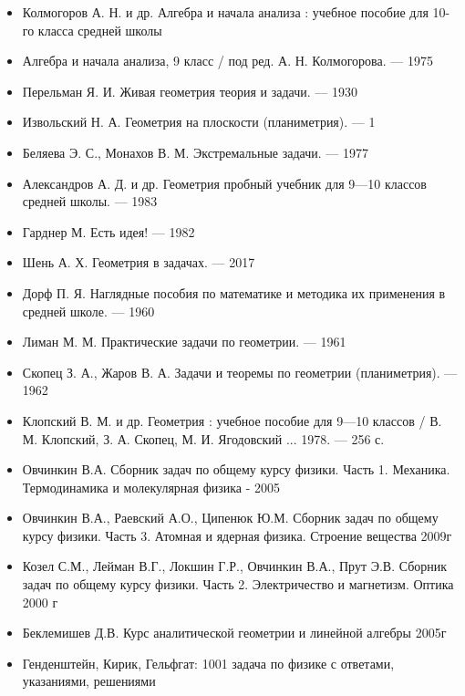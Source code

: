 \begin{itemize}
    \item Колмогоров А. Н. и др. Алгебра и начала анализа : учебное пособие для 10-го класса средней школы
    \item Алгебра и начала анализа, 9 класс / под ред. А. Н. Колмогорова. — 1975
    \item Перельман Я. И. Живая геометрия теория и задачи. — 1930
    \item Извольский Н. А. Геометрия на плоскости (планиметрия). — 1
    \item Беляева Э. С., Монахов В. М. Экстремальные задачи. — 1977
    \item Александров А. Д. и др. Геометрия пробный учебник для 9—10 классов средней школы. — 1983
    \item Гарднер М. Есть идея! — 1982
    \item Шень А. Х. Геометрия в задачах. — 2017
    \item Дорф П. Я. Наглядные пособия по математике и методика их применения в средней школе. — 1960
    \item Лиман М. М. Практические задачи по геометрии. — 1961
    \item Скопец З. А., Жаров В. А. Задачи и теоремы по геометрии (планиметрия). — 1962
    \item Клопский В. М. и др. Геометрия : учебное пособие для 9—10 классов / В. М. Клопский, З. А. Скопец, М. И. Ягодовский ... 1978. — 256 с. 
    \item Овчинкин В.А. Сборник задач по общему курсу физики. Часть 1. Механика. Термодинамика и молекулярная физика - 2005
    \item Овчинкин В.А., Раевский А.О., Ципенюк Ю.М. Сборник задач по общему курсу физики. Часть 3. Атомная и ядерная физика. Строение вещества 2009г
    \item Козел С.М., Лейман В.Г., Локшин Г.Р., Овчинкин В.А., Прут Э.В. Сборник задач по общему курсу физики. Часть 2. Электричество и магнетизм. Оптика 2000 г
    \item Беклемишев Д.В. Курс аналитической геометрии и линейной алгебры 2005г
    \item Генденштейн, Кирик, Гельфгат: 1001 задача по физике с ответами, указаниями, решениями
\end{itemize}